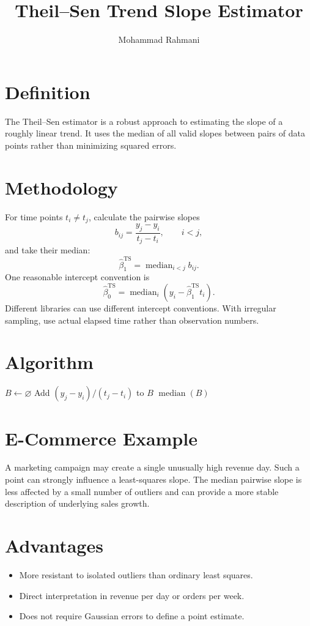 \documentclass[a4paper]{article}
\title{Theil--Sen Trend Slope Estimator}
\date{}
\author{Mohammad Rahmani}
\begin{document}
\maketitle

\section{Definition}
The Theil--Sen estimator is a robust approach to estimating the slope of a roughly linear trend. It uses the median of all valid slopes between pairs of data points rather than minimizing squared errors.

\section{Methodology}
For time points $t_i\ne t_j$, calculate the pairwise slopes
\[
 b_{ij}=\frac{y_j-y_i}{t_j-t_i},\qquad i<j,
\]
and take their median:
\[
 \widehat\beta_1^{\mathrm{TS}}
 =\operatorname{median}_{i<j} b_{ij}.
\]
One reasonable intercept convention is
\[
 \widehat\beta_0^{\mathrm{TS}}=
 \operatorname{median}_i(y_i-\widehat\beta_1^{\mathrm{TS}}t_i).
\]
Different libraries can use different intercept conventions. With irregular sampling, use actual elapsed time rather than observation numbers.

\section{Algorithm}
\begin{algorithm}[H]
\caption{Pairwise Theil--Sen slope estimation}
\begin{algorithmic}[1]
 \State $B \gets \varnothing$
    \State Add $(y_j-y_i)/(t_j-t_i)$ to $B$
   \EndIf
  \EndFor
 \EndFor
 \State \Return $\operatorname{median}(B)$
\end{algorithmic}
\end{algorithm}

\section{E-Commerce Example}
A marketing campaign may create a single unusually high revenue day. Such a point can strongly influence a least-squares slope. The median pairwise slope is less affected by a small number of outliers and can provide a more stable description of underlying sales growth.

\section{Advantages}
\begin{itemize}
 \item More resistant to isolated outliers than ordinary least squares.
 \item Direct interpretation in revenue per day or orders per week.
 \item Does not require Gaussian errors to define a point estimate.
\end{itemize}
\end{document}
